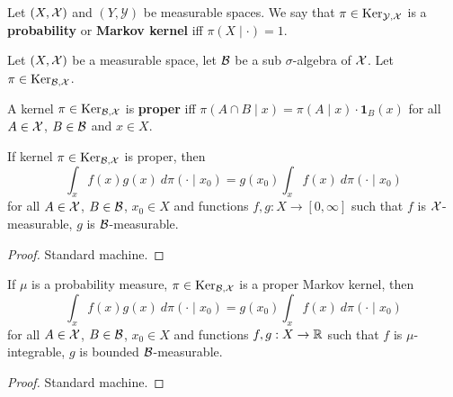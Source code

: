 \begin{definition}
    \label{def:markov-ker}
    \leanok

    Let $(X,\mathcal X)$ and $(Y,\mathcal{Y})$ be measurable spaces. We say that $\pi\in\text{Ker}_{\mathcal{Y},\mathcal X}$ is a \textbf{probability} or \textbf{Markov kernel} iff $\pi(X\mid \cdot)=1$.
\end{definition}

Let $(X, \mathcal X)$ be a measurable space, let $\mathcal B$ be a sub $\sigma$-algebra of $\mathcal X$. Let $\pi \in \text{Ker}_{\mathcal B, \mathcal X}$.

\begin{definition}
    \label{def:proper-kernel}
    \leanok

    A kernel $\pi\in\text{Ker}_{\mathcal B,\mathcal X}$ is \textbf{proper} iff $\pi(A\cap B\mid x)=\pi(A\mid x)\cdot\mathbf{1}_B(x)$ for all $A\in\mathcal X$, $B\in\mathcal B$ and $x\in X$.
\end{definition}

\begin{lemma}
    \label{lem:proper-kernel-lintegral}
    \leanok

    If kernel $\pi\in\text{Ker}_{\mathcal B,\mathcal X}$ is proper, then
    $$\int_x f(x) g(x)\ d\pi(\cdot\mid x_0) = g(x_0)\int_x f(x)\ d\pi(\cdot\mid x_0)$$
    for all $A \in \mathcal X$, $B \in \mathcal B$, $x_0 \in X$ and functions $f, g : X \to [0, \infty]$ such that $f$ is $\mathcal X$-measurable, $g$ is $\mathcal B$-measurable.
\end{lemma}
\begin{proof}
    \leanok

    Standard machine.
\end{proof}

\begin{lemma}
    \label{lem:proper-kernel-integral}
    \leanok

    If $\mu$ is a probability measure, $\pi\in\text{Ker}_{\mathcal B,\mathcal X}$ is a proper Markov kernel, then
    $$\int_x f(x) g(x)\ d\pi(\cdot\mid x_0) = g(x_0)\int_x f(x)\ d\pi(\cdot\mid x_0)$$
    for all $A \in \mathcal X$, $B \in \mathcal B$, $x_0 \in X$ and functions $f, g : X \to \mathbb R$ such that $f$ is $\mu$-integrable, $g$ is bounded $\mathcal B$-measurable.
\end{lemma}
\begin{proof}

    Standard machine.
\end{proof}

